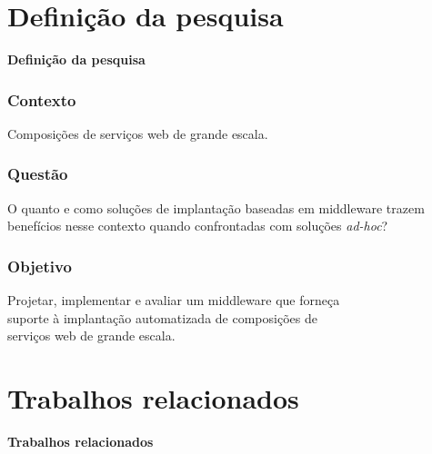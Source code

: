 \documentclass{beamer}
\newcommand\adhoc{\emph{ad-hoc}\xspace}
\newcommand\sectiontitle[1]{\begin{center}\huge\textbf{#1}\end{center}}
\newcommand\frase[1]{\begin{center}\large#1\end{center}}
\begin{document}

\section{Definição da pesquisa}

\begin{frame}

\sectiontitle{Definição da pesquisa}

\end{frame}


\begin{frame}
\frametitle{Contexto}

\frase{Composições de serviços web de grande escala.}

\end{frame}

\begin{frame}
\frametitle{Questão}

\frase{O quanto e como soluções de implantação baseadas em middleware  
trazem benefícios nesse contexto
quando confrontadas com soluções \adhoc?}

\end{frame}


\begin{frame}
\frametitle{Objetivo}

\frase{Projetar, implementar e avaliar um middleware que forneça \\ suporte à implantação automatizada de  composições de \\ serviços web de grande escala.}

\end{frame}


\section{Trabalhos relacionados}

\begin{frame}

\sectiontitle{Trabalhos relacionados}

\end{frame}
\end{document}
